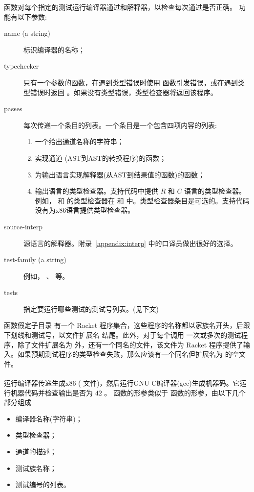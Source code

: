 \documentclass[11pt]{book}
\begin{document}
  函数对每个指定的测试运行编译器通过和解释器，以检查每次通过是否正确。  功能有以下参数:
\begin{description}
\item[name (a string)] 标识编译器的名称；
\item[typechecker] 只有一个参数的函数，在遇到类型错误时使用  函数引发错误，或在遇到类型错误时返回  。如果没有类型错误，类型检查器将返回该程序。

\item[passes] 每次传递一个条目的列表。一个条目是一个包含四项内容的列表:
  \begin{enumerate}
  \item 一个给出通道名称的字符串；
  \item 实现通道 (AST到AST的转换程序)的函数；
  \item 为输出语言实现解释器(从AST到结果值的函数)的函数；
  \item 输出语言的类型检查器。支持代码中提供 $R$ 和 $C$ 语言的类型检查器。例如， \LangVar{} 和 \LangCVar{} 的类型检查器在
     和  中。类型检查器条目是可选的。支持代码没有为x86语言提供类型检查器。
  \end{enumerate}

\item[source-interp] 源语言的解释器。附录~\ref{appendix:interp} 中的口译员做出很好的选择。
  
\item[test-family (a string)] 例如， 、  等。
\item[tests] 指定要运行哪些测试的测试号列表。(见下文)
\end{description}
%
  函数假定子目录
 有一个 Racket 程序集合，这些程序的名称都以家族名开头，后跟下划线和测试号，以文件扩展名  结尾。此外，对于每个调用  一次或多次的测试程序，除了文件扩展名为  外，还有一个同名的文件，该文件为 Racket 程序提供了输入。如果预期测试程序的类型检查失败，那么应该有一个同名但扩展名为  的空文件。


\paragraph{}

运行编译器传递生成x86 (  文件)，然后运行GNU C编译器(gcc)生成机器码。它运行机器代码并检查输出是否为 $42$ 。
 函数的形参类似于
 函数的形参，由以下几个部分组成
\begin{itemize}
\item 编译器名称(字符串)；
\item 类型检查器；
\item 通道的描述；
\item 测试族名称；
\item 测试编号的列表。
\end{itemize}
\end{document}
